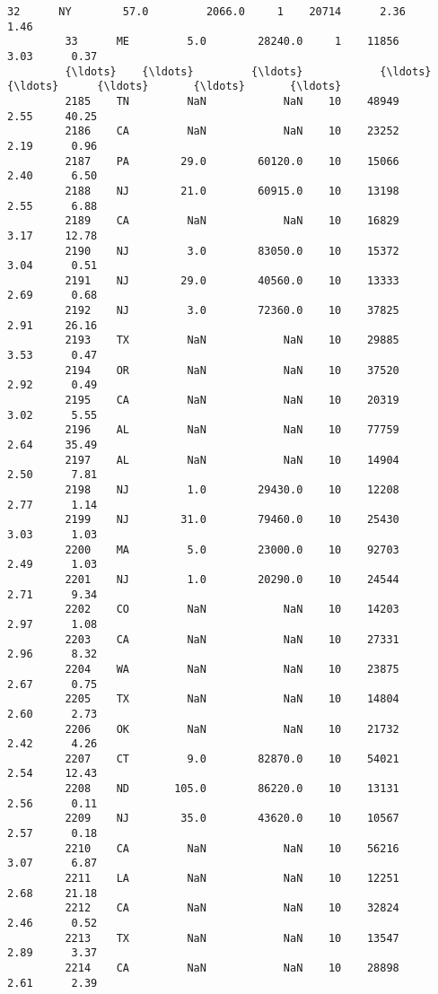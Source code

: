 \documentclass[11pt]{llncs}
\begin{document}
\begin{Verbatim}[commandchars=\\\{\}]
         32      NY        57.0         2066.0     1    20714      2.36      1.46   
         33      ME         5.0        28240.0     1    11856      3.03      0.37   
         {\ldots}    {\ldots}         {\ldots}            {\ldots}   {\ldots}      {\ldots}       {\ldots}       {\ldots}   
         2185    TN         NaN            NaN    10    48949      2.55     40.25   
         2186    CA         NaN            NaN    10    23252      2.19      0.96   
         2187    PA        29.0        60120.0    10    15066      2.40      6.50   
         2188    NJ        21.0        60915.0    10    13198      2.55      6.88   
         2189    CA         NaN            NaN    10    16829      3.17     12.78   
         2190    NJ         3.0        83050.0    10    15372      3.04      0.51   
         2191    NJ        29.0        40560.0    10    13333      2.69      0.68   
         2192    NJ         3.0        72360.0    10    37825      2.91     26.16   
         2193    TX         NaN            NaN    10    29885      3.53      0.47   
         2194    OR         NaN            NaN    10    37520      2.92      0.49   
         2195    CA         NaN            NaN    10    20319      3.02      5.55   
         2196    AL         NaN            NaN    10    77759      2.64     35.49   
         2197    AL         NaN            NaN    10    14904      2.50      7.81   
         2198    NJ         1.0        29430.0    10    12208      2.77      1.14   
         2199    NJ        31.0        79460.0    10    25430      3.03      1.03   
         2200    MA         5.0        23000.0    10    92703      2.49      1.03   
         2201    NJ         1.0        20290.0    10    24544      2.71      9.34   
         2202    CO         NaN            NaN    10    14203      2.97      1.08   
         2203    CA         NaN            NaN    10    27331      2.96      8.32   
         2204    WA         NaN            NaN    10    23875      2.67      0.75   
         2205    TX         NaN            NaN    10    14804      2.60      2.73   
         2206    OK         NaN            NaN    10    21732      2.42      4.26   
         2207    CT         9.0        82870.0    10    54021      2.54     12.43   
         2208    ND       105.0        86220.0    10    13131      2.56      0.11   
         2209    NJ        35.0        43620.0    10    10567      2.57      0.18   
         2210    CA         NaN            NaN    10    56216      3.07      6.87   
         2211    LA         NaN            NaN    10    12251      2.68     21.18   
         2212    CA         NaN            NaN    10    32824      2.46      0.52   
         2213    TX         NaN            NaN    10    13547      2.89      3.37   
         2214    CA         NaN            NaN    10    28898      2.61      2.39   
         

\end{Verbatim}
\end{document}
